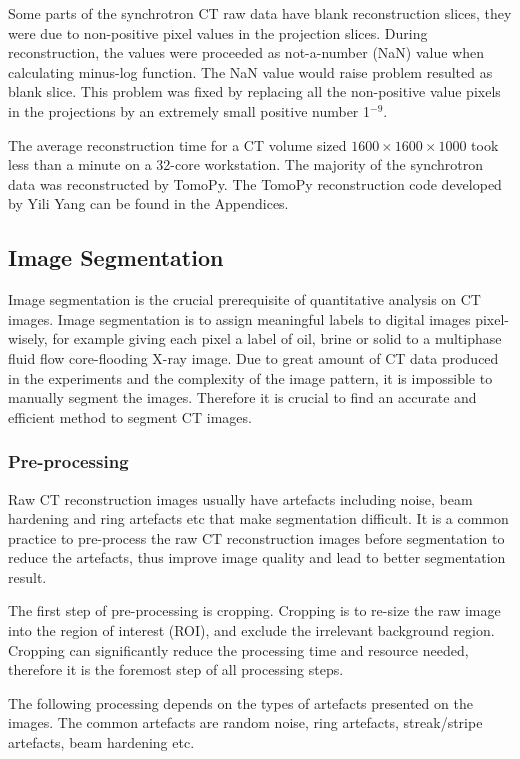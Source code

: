 Some parts of the synchrotron CT raw data have blank reconstruction slices, they were due to non-positive pixel values in the projection slices. During reconstruction, the values were proceeded as not-a-number (NaN) value when calculating minus-log function. The NaN value would raise problem resulted as blank slice. This problem was fixed by replacing all the non-positive value pixels in the projections by an extremely small positive number 1$^{-9}$.

The average reconstruction time for a CT volume sized $1600 \times 1600 \times 1000$ took less than a minute on a 32-core workstation. The majority of the synchrotron data was reconstructed by TomoPy. The TomoPy reconstruction code developed by Yili Yang can be found in the Appendices.

\subsection{Image Segmentation}
Image segmentation is the crucial prerequisite of quantitative analysis on CT images. Image segmentation is to assign meaningful labels to digital images pixel-wisely, for example giving each pixel a label of oil, brine or solid to a multiphase fluid flow core-flooding X-ray image. Due to great amount of CT data produced in the experiments and the complexity of the image pattern, it is impossible to manually segment the images. Therefore it is crucial to find an accurate and efficient method to segment CT images.

\subsubsection{Pre-processing}
Raw CT reconstruction images usually have artefacts including noise, beam hardening and ring artefacts etc that make segmentation difficult. It is a common practice to pre-process the raw CT reconstruction images before segmentation to reduce the artefacts, thus improve image quality and lead to better segmentation result. 

The first step of pre-processing is cropping. Cropping is to re-size the raw image into the region of interest (ROI), and exclude the irrelevant background region. Cropping can significantly reduce the processing time and resource needed, therefore it is the foremost step of all processing steps.

The following processing depends on the types of artefacts presented on the images. The common artefacts are random noise, ring artefacts, streak/stripe artefacts, beam hardening etc.

